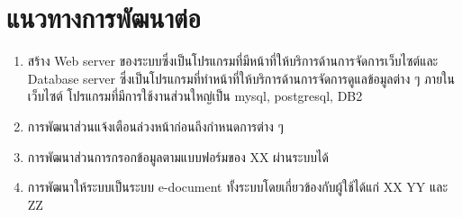 \section{แนวทางการพัฒนาต่อ}
\begin{enumerate}
	\item สร้าง Web server ของระบบซึ่งเป็นโปรแกรมที่มีหน้าที่ให้บริการด้านการจัดการเว็บไซต์และ Database server ซึ่งเป็นโปรแกรมที่ทำหน้าที่ให้บริการด้านการจัดการดูแลข้อมูลต่าง ๆ ภายในเว็บไซต์ โปรแกรมที่มีการใช้งานส่วนใหญ่เป็น mysql, postgresql, DB2
 	\item การพัฒนาส่วนแจ้งเตือนล่วงหน้าก่อนถึงกำหนดการต่าง ๆ 
 	\item การพัฒนาส่วนการกรอกข้อมูลตามแบบฟอร์มของ XX ผ่านระบบได้
  \item การพัฒนาให้ระบบเป็นระบบ e-document ทั้งระบบโดยเกี่ยวข้องกับผู้ใช้ได้แก่ XX YY และ ZZ 
\end{enumerate}




